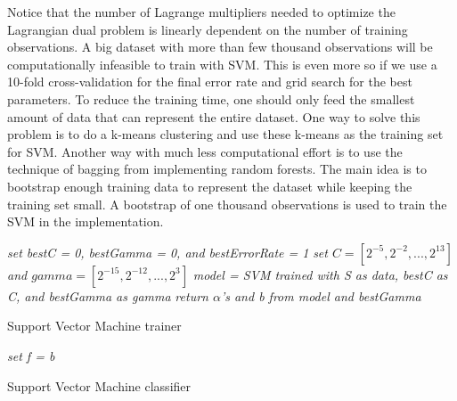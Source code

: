 \documentclass[twoside]{article}
\begin{document}
Notice that the number of Lagrange multipliers needed to optimize the Lagrangian dual problem is linearly dependent on the number of training observations. A big dataset with more than few thousand observations will be computationally infeasible to train with SVM. This is even more so if we use a 10-fold cross-validation for the final error rate and grid search for the best parameters. To reduce the training time, one should only feed the smallest amount of data that can represent the entire dataset. One way to solve this problem is to do a k-means clustering and use these k-means as the training set for SVM. Another way with much less computational effort is to use the technique of bagging from implementing random forests. The main idea is to bootstrap enough training data to represent the dataset while keeping the training set small. A bootstrap of one thousand observations is used to train the SVM in the implementation.

\IncMargin{1em}
\begin{algorithm}
\BlankLine
{}
\emph{set bestC = 0, bestGamma = 0, and bestErrorRate = 1}\;
\emph{set $C = [2^{-5}, 2^{-2}, ..., 2^{13}]$ and $gamma = [2^{-15}, 2^{-12}, ..., 2^{3}]$}\;
\emph{model = SVM trained with S as data, bestC as C, and bestGamma as gamma}\;
\emph{return $\alpha$'s and b from model and bestGamma}\;
\caption{Support Vector Machine trainer}\label{SVMt}
\end{algorithm}\DecMargin{1em}

\IncMargin{1em}
\begin{algorithm}
\BlankLine
\emph{set f = b}\;
\caption{Support Vector Machine classifier}\label{SVMc}
\end{algorithm}\DecMargin{1em}
\end{document}
